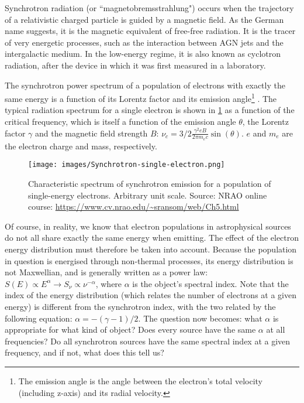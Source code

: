 \pg
Synchrotron radiation (or ``magnetobremsstrahlung") occurs when the trajectory of a relativistic charged particle is guided by a magnetic field. As the German name suggests, it is the magnetic equivalent of free-free radiation. It is the tracer of very energetic processes, such as the interaction between AGN jets and the intergalactic medium. In the low-energy regime, it is also known as cyclotron radiation, after the device in which it was first measured in a laboratory. %

\pg
The synchrotron power spectrum of a population of electrons with exactly the same energy is a function of its Lorentz factor and its emission angle\footnote{The emission angle is the angle between the electron's total velocity (including z-axis) and its radial velocity.} . The typical radiation spectrum for a single electron is shown in \cref{fig.synchrotron.1electrion} as a function of the critical frequency, which is itself a function of the emission angle $\theta$, the Lorentz factor $\gamma$ and the magnetic field strength $B$: $\nu_c=3/2\frac{\gamma^2 e B}{2\pi m_e c}\sin(\theta)$. $e$ and $m_e$ are the electron charge and mass, respectively.
\begin{figure}[!h]
\centering
\texttt{[image: images/Synchrotron-single-electron.png]}
\caption{\label{fig.synchrotron.1electrion} Characteristic spectrum of synchrotron emission for a population of single-energy electrons. Arbitrary unit scale. Source: NRAO online course: \url{https://www.cv.nrao.edu/~sransom/web/Ch5.html}}
\end{figure}

\pg
Of course, in reality, we know that electron populations in astrophysical sources do not all share exactly the same energy when emitting. The effect of the electron energy distribution must therefore be taken into account. Because the population in question is energised through non-thermal processes, its energy distribution is not Maxwellian, and is generally written as a power law: $S(E) \propto E^\alpha \rightarrow S_\nu \propto \nu^{-\alpha}$, where $\alpha$ is the object's spectral index. Note that the index of the energy distribution (which relates the number of electrons at a given energy) is different from the synchrotron index, with the two related by the following equation: $\alpha=-(\gamma-1)/2$.
The question now becomes: what $\alpha$ is appropriate for what kind of object? Does every source have the same $\alpha$ at all frequencies? Do all synchrotron sources have the same spectral index at a given frequency, and if not, what does this tell us?

